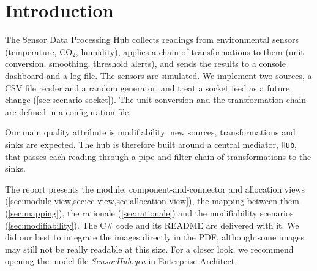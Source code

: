 \documentclass[../main-en.tex]{subfiles}
\begin{document}
\section{Introduction}

The Sensor Data Processing Hub collects readings from environmental sensors (temperature, CO$_2$, humidity), applies a chain of transformations to them (unit conversion, smoothing, threshold alerts), and sends the results to a console dashboard and a log file. The sensors are simulated. We implement two sources, a CSV file reader and a random generator, and treat a socket feed as a future change (\cref{sec:scenario-socket}). The unit conversion and the transformation chain are defined in a configuration file.

Our main quality attribute is modifiability: new sources, transformations and sinks are expected. The hub is therefore built around a central mediator, \texttt{Hub}, that passes each reading through a pipe-and-filter chain of transformations to the sinks.

The report presents the module, component-and-connector and allocation views (\cref{sec:module-view,sec:cc-view,sec:allocation-view}), the mapping between them (\cref{sec:mapping}), the rationale (\cref{sec:rationale}) and the modifiability scenarios (\cref{sec:modifiability}). The C\# code and its README are delivered with it. We did our best to integrate the images directly in the PDF, although some images may still not be really readable at this size. For a closer look, we recommend opening the model file \textit{SensorHub.qea} in Enterprise Architect.
\end{document}
